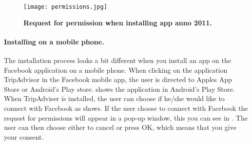 \begin{figure}[t]
\centering
\texttt{[image: permissions.jpg]}
\caption[Request for permission when installing app anno 2011]{\textbf{Request for permission when installing app anno 2011.} } 
\label{fig:permissions2011}
\end{figure}

\paragraph{Installing on a mobile phone.}
The installation process looks a bit different when you install an app on the Facebook application on a mobile phone. When clicking on the application TripAdvisor in the Facebook mobile app, the user is directed to Apples App Store or Android's Play store.  shows the application in Android's Play Store. When TripAdviser is installed, the user can choose if he/she would like to connect with Facebook as  shows. If the user choose to connect with Facebook the request for permissions will appear in a pop-up window, this you can see in . The user can then choose either to cancel or press OK, which means that you give your consent. 

